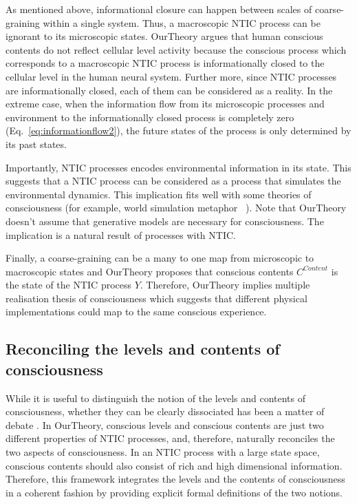 \documentclass[utf8]{article}
\begin{document}
    		As mentioned above, informational closure can happen between scales of coarse-graining within a single system. Thus, a macroscopic NTIC process can be ignorant to its microscopic states. \ac{OurTheory} argues that human conscious contents do not reflect cellular level activity because the conscious process which corresponds to a macroscopic NTIC process is informationally closed to the cellular level in the human neural system. Further more, since NTIC processes are informationally closed, each of them can be considered as a reality. In the extreme case, when the information flow from its microscopic processes and environment to the informationally closed process is completely zero (Eq.~\ref{eq:informationflow2}), the future states of the process is only determined by its past states. 
    		
    		Importantly, NTIC processes encodes environmental information in its state. This suggests that a NTIC process can be considered as a process that simulates the environmental dynamics. This implication fits well with some theories of consciousness (for example, world simulation metaphor ~\citep{revonsuo2006inner}). Note that \ac{OurTheory} doesn't assume that generative models are necessary for consciousness. The implication is a natural result of processes with NTIC. 
            
            Finally, a coarse-graining can be a many to one map from microscopic to macroscopic states and \ac{OurTheory} proposes that conscious contents $C^{Content}$ is the state of the NTIC process $Y$. Therefore, \ac{OurTheory} implies multiple realisation thesis of consciousness \citep{putnam1967psychological,bechtel1999multiple} which suggests that different physical implementations could map to the same conscious experience.
            
            
	    \subsection{Reconciling the levels and contents of consciousness}\label{sec:reconcile}
    	    While it is useful to distinguish the notion of the levels and contents of consciousness, whether they can be clearly dissociated has been a matter of debate \citep{bayne2016there, Fazekas2016}. In \ac{OurTheory}, conscious levels and conscious contents are just two different properties of NTIC processes, and, therefore, naturally reconciles the two aspects of consciousness. In an NTIC process with a large state space, conscious contents should also consist of rich and high dimensional information. Therefore, this framework integrates the levels and the contents of consciousness in a coherent fashion by providing explicit formal definitions of the two notions.  
    	    
\end{document}
